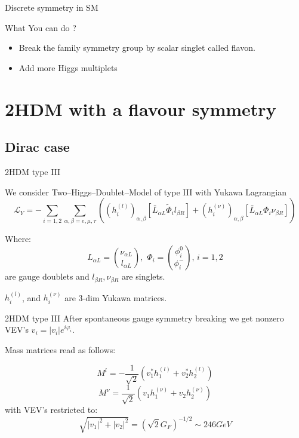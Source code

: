 \documentclass{beamer}
\begin{document}
\begin{frame}{Discrete symmetry in SM}
\begin{block}{What You can do ?}

\begin{itemize}
\item Break the family symmetry group by scalar singlet called \alert{flavon}.
\item Add \alert{more Higgs multiplets} 
\end{itemize}
\end{block}

\end{frame}


\section{2HDM with a flavour symmetry}

\subsection{Dirac case}
\begin{frame}{2HDM type III}

We consider Two--Higgs--Doublet--Model of type III with Yukawa Lagrangian
$$ \mathcal{L}_Y = -\sum_{i=1,2} \sum_{\alpha, \beta= e,\mu,\tau}\left( (h_i^{(l)})_{\alpha,\beta}\left[ \bar{L}_{\alpha L}\tilde{\Phi}_i l_{\beta R}\right] + (h_i^{(\nu)})_{\alpha, \beta}\left[ \bar{L}_{\alpha L}\Phi_i \nu_{\beta R} \right]\right)$$

Where: 
$$L_{\alpha L}= {\nu_{\alpha L}\choose l_{\alpha L}}, \,\,\Phi_i = {\phi_i^0 \choose \phi_i^{-}}, \, i=1,2$$ are gauge doublets and $l_{\beta R}, \nu_{\beta R}$ are singlets.

$h_i^{(l)}$, and $h_i^{(\nu)}$ are 3-dim Yukawa matrices. 

\end{frame}

\begin{frame}{2HDM type III}
After spontaneous gauge symmetry breaking we get nonzero VEV's 
$v_i=|{v_i}|e^{i\varphi_i}$.

Mass matrices read as follows:

$$M^l = -\frac{1}{\sqrt{2}}\left(v_1^{\ast}h_1^{(l)} + v_2^{\ast}h_2^{(l)} \right)$$
$$M^\nu = \frac{1}{\sqrt{2}}\left(v_1h_1^{(\nu)} + v_2h_2^{(\nu)} \right)$$
with VEV's restricted to: 
$$\sqrt{|v_1|^2 +|v_2|^2}=\left(\sqrt{2}G_F\right)^{-1/2}\sim 246 GeV$$
\end{frame}
\end{document}
